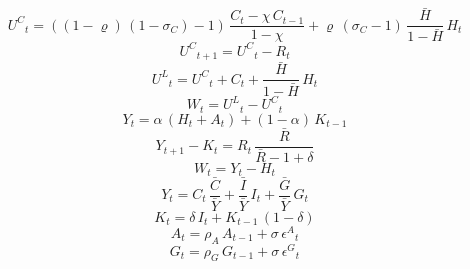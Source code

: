\begin{dmath}
{U^{C}}_{t}=\left(\left(1-{{\varrho}}\right)\, \left(1-{{\sigma_{C}}}\right)-1\right)\, \frac{{C}_{t}-{{\chi}}\, {C}_{t-1}}{1-{{\chi}}}+{{\varrho}}\, \left({{\sigma_{C}}}-1\right)\, \frac{{\bar{H}}}{1-{\bar{H}}}\, {H}_{t}
\end{dmath}
\begin{dmath}
{U^{C}}_{t+1}={U^{C}}_{t}-{R}_{t}
\end{dmath}
\begin{dmath}
{U^{L}}_{t}={U^{C}}_{t}+{C}_{t}+\frac{{\bar{H}}}{1-{\bar{H}}}\, {H}_{t}
\end{dmath}
\begin{dmath}
{W}_{t}={U^{L}}_{t}-{U^{C}}_{t}
\end{dmath}
\begin{dmath}
{Y}_{t}={{\alpha}}\, \left({H}_{t}+{A}_{t}\right)+\left(1-{{\alpha}}\right)\, {K}_{t-1}
\end{dmath}
\begin{dmath}
{Y}_{t+1}-{K}_{t}={R}_{t}\, \frac{{\bar{R}}}{{\bar{R}}-1+{{\delta}}}
\end{dmath}
\begin{dmath}
{W}_{t}={Y}_{t}-{H}_{t}
\end{dmath}
\begin{dmath}
{Y}_{t}={C}_{t}\, {\frac{\bar{C}}{\bar{Y}}}+{\frac{\bar{I}}{\bar{Y}}}\, {I}_{t}+{\frac{\bar{G}}{\bar{Y}}}\, {G}_{t}
\end{dmath}
\begin{dmath}
{K}_{t}={{\delta}}\, {I}_{t}+{K}_{t-1}\, \left(1-{{\delta}}\right)
\end{dmath}
\begin{dmath}
{A}_{t}={{\rho_{A}}}\, {A}_{t-1}+{{\sigma}}\, {{\epsilon^{A}}}_{t}
\end{dmath}
\begin{dmath}
{G}_{t}={{\rho_{G}}}\, {G}_{t-1}+{{\sigma}}\, {{\epsilon^{G}}}_{t}
\end{dmath}

